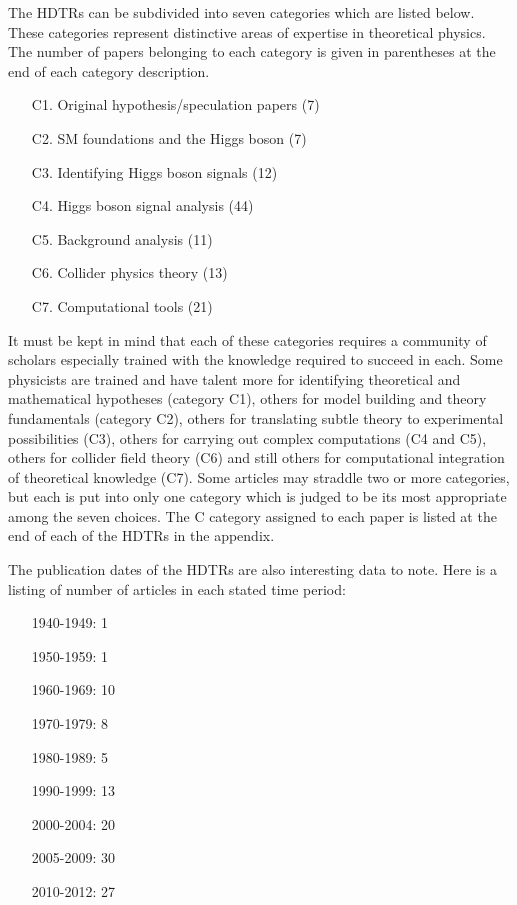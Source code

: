 \documentclass[letter,12pt]{article}
\begin{document}
The HDTRs can be subdivided into seven categories which are listed below. These categories represent distinctive areas of expertise in theoretical physics.
The number of papers belonging to each category is given in parentheses at the end of each category description.  

\begin{enumerate}
\item[C1.] Original hypothesis/speculation papers (7)
\item[C2.] SM foundations and the Higgs boson (7)
\item[C3.] Identifying Higgs boson signals (12)
\item[C4.] Higgs boson signal analysis (44)
\item[C5.] Background analysis (11)
\item[C6.] Collider physics theory (13)
\item[C7.] Computational tools (21)
\end{enumerate}

It must be kept in mind that each of these categories requires a community of scholars especially trained with the knowledge required to succeed in each. Some physicists are trained and have talent more for identifying theoretical and mathematical hypotheses (category C1), others for model building and theory fundamentals (category C2), others for translating subtle theory to experimental possibilities (C3), others for carrying out complex computations (C4 and C5), others for collider field theory (C6) and still others for computational integration of theoretical knowledge (C7). Some articles may straddle two or more categories, but each is put into only one category which is judged to be its most appropriate among the seven choices. The C category assigned to each paper is listed at the end of each of the HDTRs in the appendix.

The publication dates of the HDTRs are also interesting data to note. Here is a listing of number of articles in each stated time period:

\begin{enumerate}
\item[]1940-1949: 1
\item[]1950-1959: 1
\item[]1960-1969: 10
\item[]1970-1979: 8
\item[]1980-1989: 5
\item[]1990-1999: 13
\item[]2000-2004: 20
\item[]2005-2009: 30
\item[]2010-2012: 27
\end{enumerate}
\end{document}

